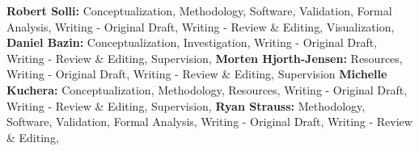 \documentclass[12pt]{article}
\begin{document}
{\bf Robert Solli:} Conceptualization, Methodology, Software, Validation, Formal Analysis, Writing - Original Draft, Writing - Review \& Editing, Visualization,
{\bf Daniel Bazin:} Conceptualization, Investigation, Writing - Original Draft, Writing - Review \& Editing, Supervision,
{\bf Morten Hjorth-Jensen:} Resources, Writing - Original Draft, Writing - Review \& Editing, Supervision
{\bf Michelle Kuchera:} Conceptualization, Methodology, Resources, Writing - Original Draft, Writing - Review \& Editing, Supervision,
{\bf Ryan Strauss:} Methodology, Software, Validation, Formal Analysis, Writing - Original Draft, Writing - Review \& Editing,
\end{document}
